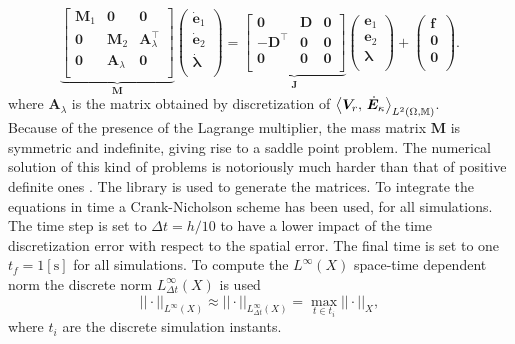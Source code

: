 \begin{equation*}
\underbrace{
	\begin{bmatrix}
	\mathbf{M}_1 & \mathbf{0} & \mathbf{0}\\
	\mathbf{0} & \mathbf{M}_2 & \mathbf{A}_\lambda^\top\\
	\mathbf{0} & \mathbf{A}_\lambda & \mathbf{0} \\
	\end{bmatrix}}_{\mathbf{M}}
\begin{pmatrix}
\dot{\mathbf{e}}_1 \\
\dot{\mathbf{e}}_2 \\
\dot{\bm{\lambda}} \\
\end{pmatrix} = 
\underbrace{
	\begin{bmatrix}
	\mathbf{0} & \mathbf{D} & \mathbf{0}\\
	-\mathbf{D}^\top & \mathbf{0} & \mathbf{0} \\
	\mathbf{0} & \mathbf{0} & \mathbf{0} \\
	\end{bmatrix}}_{\mathbf{J}}
\begin{pmatrix}
{\mathbf{e}}_1 \\
{\mathbf{e}}_2 \\
\bm{\lambda} \\
\end{pmatrix} + 
\begin{pmatrix}
\mathbf{f} \\
\mathbf{0} \\
\mathbf{0} \\
\end{pmatrix}. 
\end{equation*}
where $\mathbf{A}_\lambda$ is the matrix obtained by discretization of $\inner[L^2(\Omega, \mathbb{M})]{\bm{V}_r}{\dot{\bm{E}}_\kappa}$. \\
Because of the presence of the Lagrange multiplier, the mass matrix $\mathbf{M}$ is symmetric and indefinite, giving rise to a saddle point problem. The numerical solution of this kind of problems is notoriously much harder than that of positive definite ones \cite{benzi2005}. The {} library \cite{rathgeber2017firedrake} is used to generate the matrices. To integrate the equations in time a Crank-Nicholson scheme has been used, for all simulations. The time step is set to $\Delta t = h/10$ to have a lower impact of the time discretization error with respect to the spatial error. The final time is set to one $t_f = 1 [\textrm{s}]$ for all simulations. To compute the $L^\infty ({X})$ space-time dependent norm  the discrete norm $L^\infty_{\Delta t} ({X})$ is used
\[
||\cdot ||_{L^\infty ({X})} \approx || \cdot ||_{L^\infty_{\Delta t} ({X})} = \max_{t \in t_i} ||\cdot||_{{X}},
\]
where $t_i$ are the discrete simulation instants. 
